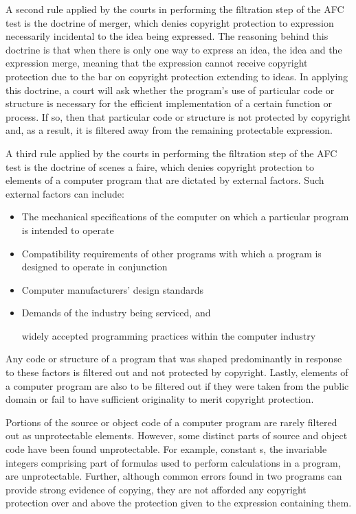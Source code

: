 A second rule applied by the courts in performing the filtration step of
the AFC test is the doctrine of merger, which denies copyright protection
to expression necessarily incidental to the idea being expressed. The
reasoning behind this doctrine is that when there is only one way to
express an idea, the idea and the expression merge, meaning that the
expression cannot receive copyright protection due to the bar on copyright
protection extending to ideas. In applying this doctrine, a court will ask
whether the program's use of particular code or structure is necessary for
the efficient implementation of a certain function or process. If so, then
that particular code or structure is not protected by copyright and, as a
result, it is filtered away from the remaining protectable expression.

A third rule applied by the courts in performing the filtration step of
the AFC test is the doctrine of scenes a faire, which denies copyright
protection to elements of a computer program that are dictated by external
factors. Such external factors can include:

\begin{itemize}

  \item The mechanical
specifications of the computer on which a particular program is intended
to operate

  \item Compatibility requirements of other programs with which a
program is designed to operate in conjunction

  \item Computer manufacturers'
design standards

  \item Demands of the industry being serviced, and

widely accepted programming practices within the computer industry

\end{itemize}

Any code or structure of a program that was shaped predominantly in
response to these factors is filtered out and not protected by
copyright. Lastly, elements of a computer program are also to be filtered
out if they were taken from the public domain or fail to have sufficient
originality to merit copyright protection.

Portions of the source or object code of a computer program are rarely
filtered out as unprotectable elements. However, some distinct parts of
source and object code have been found unprotectable. For example,
constant s, the invariable integers comprising part of formulas used to
perform calculations in a program, are unprotectable. Further, although
common errors found in two programs can provide strong evidence of
copying, they are not afforded any copyright protection over and above the
protection given to the expression containing them.

